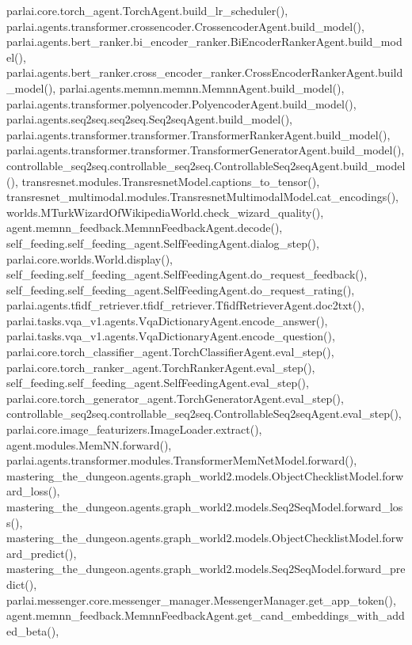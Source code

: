 parlai.\+core.\+torch\+\_\+agent.\+Torch\+Agent.\+build\+\_\+lr\+\_\+scheduler(), parlai.\+agents.\+transformer.\+crossencoder.\+Crossencoder\+Agent.\+build\+\_\+model(), parlai.\+agents.\+bert\+\_\+ranker.\+bi\+\_\+encoder\+\_\+ranker.\+Bi\+Encoder\+Ranker\+Agent.\+build\+\_\+model(), parlai.\+agents.\+bert\+\_\+ranker.\+cross\+\_\+encoder\+\_\+ranker.\+Cross\+Encoder\+Ranker\+Agent.\+build\+\_\+model(), parlai.\+agents.\+memnn.\+memnn.\+Memnn\+Agent.\+build\+\_\+model(), parlai.\+agents.\+transformer.\+polyencoder.\+Polyencoder\+Agent.\+build\+\_\+model(), parlai.\+agents.\+seq2seq.\+seq2seq.\+Seq2seq\+Agent.\+build\+\_\+model(), parlai.\+agents.\+transformer.\+transformer.\+Transformer\+Ranker\+Agent.\+build\+\_\+model(), parlai.\+agents.\+transformer.\+transformer.\+Transformer\+Generator\+Agent.\+build\+\_\+model(), controllable\+\_\+seq2seq.\+controllable\+\_\+seq2seq.\+Controllable\+Seq2seq\+Agent.\+build\+\_\+model(), transresnet.\+modules.\+Transresnet\+Model.\+captions\+\_\+to\+\_\+tensor(), transresnet\+\_\+multimodal.\+modules.\+Transresnet\+Multimodal\+Model.\+cat\+\_\+encodings(), worlds.\+M\+Turk\+Wizard\+Of\+Wikipedia\+World.\+check\+\_\+wizard\+\_\+quality(), agent.\+memnn\+\_\+feedback.\+Memnn\+Feedback\+Agent.\+decode(), self\+\_\+feeding.\+self\+\_\+feeding\+\_\+agent.\+Self\+Feeding\+Agent.\+dialog\+\_\+step(), parlai.\+core.\+worlds.\+World.\+display(), self\+\_\+feeding.\+self\+\_\+feeding\+\_\+agent.\+Self\+Feeding\+Agent.\+do\+\_\+request\+\_\+feedback(), self\+\_\+feeding.\+self\+\_\+feeding\+\_\+agent.\+Self\+Feeding\+Agent.\+do\+\_\+request\+\_\+rating(), parlai.\+agents.\+tfidf\+\_\+retriever.\+tfidf\+\_\+retriever.\+Tfidf\+Retriever\+Agent.\+doc2txt(), parlai.\+tasks.\+vqa\+\_\+v1.\+agents.\+Vqa\+Dictionary\+Agent.\+encode\+\_\+answer(), parlai.\+tasks.\+vqa\+\_\+v1.\+agents.\+Vqa\+Dictionary\+Agent.\+encode\+\_\+question(), parlai.\+core.\+torch\+\_\+classifier\+\_\+agent.\+Torch\+Classifier\+Agent.\+eval\+\_\+step(), parlai.\+core.\+torch\+\_\+ranker\+\_\+agent.\+Torch\+Ranker\+Agent.\+eval\+\_\+step(), self\+\_\+feeding.\+self\+\_\+feeding\+\_\+agent.\+Self\+Feeding\+Agent.\+eval\+\_\+step(), parlai.\+core.\+torch\+\_\+generator\+\_\+agent.\+Torch\+Generator\+Agent.\+eval\+\_\+step(), controllable\+\_\+seq2seq.\+controllable\+\_\+seq2seq.\+Controllable\+Seq2seq\+Agent.\+eval\+\_\+step(), parlai.\+core.\+image\+\_\+featurizers.\+Image\+Loader.\+extract(), agent.\+modules.\+Mem\+N\+N.\+forward(), parlai.\+agents.\+transformer.\+modules.\+Transformer\+Mem\+Net\+Model.\+forward(), mastering\+\_\+the\+\_\+dungeon.\+agents.\+graph\+\_\+world2.\+models.\+Object\+Checklist\+Model.\+forward\+\_\+loss(), mastering\+\_\+the\+\_\+dungeon.\+agents.\+graph\+\_\+world2.\+models.\+Seq2\+Seq\+Model.\+forward\+\_\+loss(), mastering\+\_\+the\+\_\+dungeon.\+agents.\+graph\+\_\+world2.\+models.\+Object\+Checklist\+Model.\+forward\+\_\+predict(), mastering\+\_\+the\+\_\+dungeon.\+agents.\+graph\+\_\+world2.\+models.\+Seq2\+Seq\+Model.\+forward\+\_\+predict(), parlai.\+messenger.\+core.\+messenger\+\_\+manager.\+Messenger\+Manager.\+get\+\_\+app\+\_\+token(), agent.\+memnn\+\_\+feedback.\+Memnn\+Feedback\+Agent.\+get\+\_\+cand\+\_\+embeddings\+\_\+with\+\_\+added\+\_\+beta(), 
